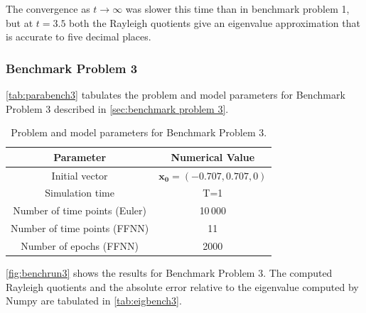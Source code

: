 The convergence as $t\to\infty$ was slower this time than in benchmark problem 1, but at $t=3.5$ both the Rayleigh quotients give an eigenvalue approximation that is accurate to five decimal places.

\subsubsection{Benchmark Problem 3}

\autoref{tab:parabench3} tabulates the problem and model parameters for Benchmark Problem 3 described in \autoref{sec:benchmark problem 3}. 

\begin{table}[H]
\caption{Problem and model parameters for Benchmark Problem 3.}
\centering
{}
\begin{tabular}{c|c}
\hline
\hline 
Parameter & Numerical Value
\\
\hline 
\hline 
Initial vector & $\bm{x_0}=(-0.707, 0.707, 0)$
\\
Simulation time & T=1
\\
Number of time points (Euler) & 10\,000
\\
Number of time points (FFNN) & 11
\\
Number of epochs (FFNN) & 2000
\\
\hline
\hline 
\end{tabular}
\label{tab:parabench3}
\end{table}


\autoref{fig:benchrun3} shows the results for Benchmark Problem 3. The computed Rayleigh quotients and the absolute error relative to the eigenvalue computed by Numpy are tabulated in \autoref{tab:eigbench3}.

